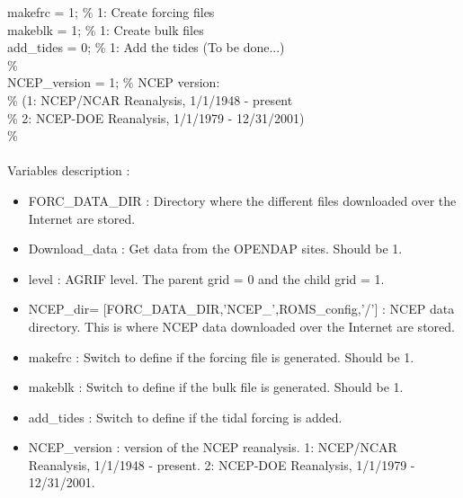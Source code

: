 makefrc      = 1;                            \% 1: Create forcing files\\
makeblk      = 1;                            \% 1: Create bulk files\\
add\_tides     = 0;                     \% 1: Add the tides (To be done...)\\
\%\\
NCEP\_version  = 1;                            \% NCEP version:\\
\%                                 (1: NCEP/NCAR Reanalysis, 1/1/1948 - present\\
\%                                  2: NCEP-DOE Reanalysis, 1/1/1979 - 12/31/2001)\\
\%\\
\\
Variables description :
\begin{itemize}
\item FORC\_DATA\_DIR : Directory where the different files downloaded over 
the Internet are stored.
\item Download\_data : Get data from the OPENDAP sites. Should be 1.
\item level : AGRIF level. The parent grid = 0 and the child grid = 1.
\item NCEP\_dir= [FORC\_DATA\_DIR,'NCEP\_',ROMS\_config,'/'] : NCEP data directory. 
This is where NCEP data downloaded over the Internet are stored.
\item makefrc : Switch to define if the forcing file is generated. Should be 1.
\item makeblk : Switch to define if the bulk file is generated. Should be 1.
\item add\_tides : Switch to define if the tidal forcing is added. 
\item NCEP\_version : version of the NCEP reanalysis. 1: NCEP/NCAR Reanalysis, 1/1/1948 - present.
2: NCEP-DOE Reanalysis, 1/1/1979 - 12/31/2001.
\end{itemize}

